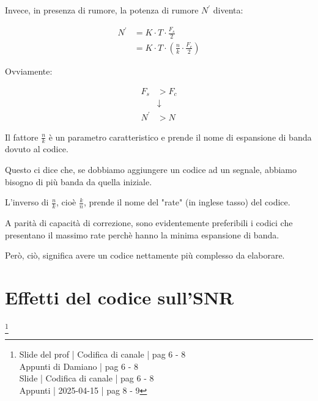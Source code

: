 Invece, in presenza di rumore, la potenza di rumore $N^{'}$ diventa: 

{
    \Large 
    \begin{equation}
        \begin{split}
            N^{'}
            &= 
            K \cdot T \cdot \frac{F_s}{2}
            \\
            &= 
            K \cdot T \cdot \left( \frac{n}{k} \cdot \frac{F_c}{2} \right)
        \end{split}
    \end{equation}
}


Ovviamente: 

{
    \Large 
    \begin{equation}
        \begin{split}
            F_s  &> F_c
            \\
            &\downarrow
            \\
            N ^{'} &>  N
        \end{split} 
    \end{equation}
}

Il fattore $\frac{n}{k}$ è un parametro caratteristico e prende il nome di espansione di banda dovuto al codice. \newline 

Questo ci dice che, se dobbiamo aggiungere un codice ad un segnale, abbiamo bisogno di più banda da quella iniziale. \newline 

L'inverso di $\frac{n}{k}$, cioè $\frac{k}{n}$, prende il nome del "rate" (in inglese tasso) del codice. \newline 

A parità di capacità di correzione, sono evidentemente preferibili i codici che presentano il massimo rate perchè hanno la minima espansione di banda. \newline 

Però, ciò, significa avere un codice nettamente più complesso da elaborare. \newline 

\newpage 

\section{Effetti del codice sull'SNR}
\footnote{Slide del prof | Codifica di canale | pag 6 - 8\\
Appunti di Damiano | pag 6 - 8\\ 
Slide | Codifica di canale | pag  6 - 8\\ 
Appunti | 2025-04-15 | pag 8 - 9
}

